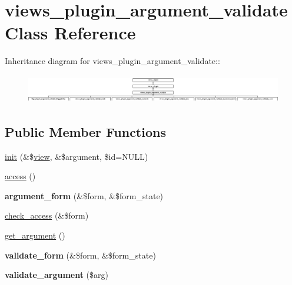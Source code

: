 \hypertarget{classviews__plugin__argument__validate}{
\section{views\_\-plugin\_\-argument\_\-validate Class Reference}
\label{classviews__plugin__argument__validate}
}
Inheritance diagram for views\_\-plugin\_\-argument\_\-validate::\begin{figure}[H]
\begin{center}
\leavevmode
\includegraphics[height=1.26984cm]{classviews__plugin__argument__validate}
\end{center}
\end{figure}
\subsection*{Public Member Functions}
\begin{CompactItemize}
\item 
\hyperlink{classviews__plugin__argument__validate_d3a9fbaccf486d38039340ce03fd577a}{init} (\&\$\hyperlink{classview}{view}, \&\$argument, \$id=NULL)
\item 
\hyperlink{classviews__plugin__argument__validate_b90c095a5a91dcf8dfae02dc975d974e}{access} ()
\item 
\hypertarget{classviews__plugin__argument__validate_97cc6a775b7d8dd0292b1b9f19e6a16d}{
\textbf{argument\_\-form} (\&\$form, \&\$form\_\-state)}
\label{classviews__plugin__argument__validate_97cc6a775b7d8dd0292b1b9f19e6a16d}

\item 
\hyperlink{classviews__plugin__argument__validate_0e10193a9cac68bcfb9dccab9277c35a}{check\_\-access} (\&\$form)
\item 
\hyperlink{classviews__plugin__argument__validate_a5ce3161f5f33df417719506c1613446}{get\_\-argument} ()
\item 
\hypertarget{classviews__plugin__argument__validate_7cbe1703f3d9aba294fd68a41cd69827}{
\textbf{validate\_\-form} (\&\$form, \&\$form\_\-state)}
\label{classviews__plugin__argument__validate_7cbe1703f3d9aba294fd68a41cd69827}

\item 
\hypertarget{classviews__plugin__argument__validate_e8f4a519d234cbc3d1398f49109b727a}{
\textbf{validate\_\-argument} (\$arg)}
\label{classviews__plugin__argument__validate_e8f4a519d234cbc3d1398f49109b727a}

\end{CompactItemize}
